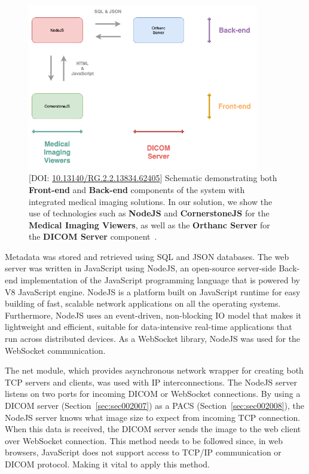 \begin{figure}[ht]
\centering
\includegraphics[width=0.90\textwidth]{images/fig011}
\caption{[DOI: \href{https://doi.org/10.13140/rg.2.2.13834.62405}{10.13140/RG.2.2.13834.62405}] Schematic demonstrating both {\bf Front-end} and {\bf Back-end} components of the system with integrated medical imaging solutions. In our solution, we show the use of technologies such as {\bf NodeJS} and {\bf CornerstoneJS} for the {\bf Medical Imaging Viewers}, as well as the {\bf Orthanc Server} for the {\bf DICOM Server} component~\cite{https://doi.org/10.13140/rg.2.2.13834.62405}.}
\label{fig:fig011}
\end{figure}

Metadata was stored and retrieved using \ac{SQL} and \ac{JSON} databases.
The web server was written in JavaScript using NodeJS, an open-source server-side Back-end implementation of the JavaScript programming language that is powered by V8 JavaScript engine.
NodeJS is a platform built on JavaScript runtime for easy building of fast, scalable network applications on all the operating systems.
Furthermore, NodeJS uses an event-driven, non-blocking \ac{IO} model that makes it lightweight and efficient, suitable for data-intensive real-time applications that run across distributed devices.
As a WebSocket library, NodeJS was used for the WebSocket communication.

The net module, which provides asynchronous network wrapper for creating both \ac{TCP} servers and clients, was used with \ac{IP} interconnections.
The NodeJS server listens on two ports for incoming \ac{DICOM} or WebSocket connections.
By using a \ac{DICOM} server (Section~\ref{sec:sec002007}) as a \ac{PACS} (Section~\ref{sec:sec002008}), the NodeJS server knows what image size to expect from incoming \ac{TCP} connection.
When this data is received, the \ac{DICOM} server sends the image to the web client over WebSocket connection.
This method needs to be followed since, in web browsers, JavaScript does not support access to \ac{TCP}/\ac{IP} communication or \ac{DICOM} protocol.
Making it vital to apply this method.


